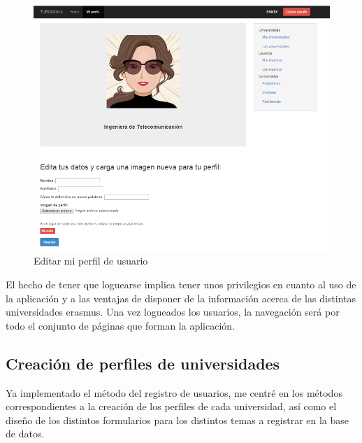 \begin{figure}[htbp]
	
	\centering
	\includegraphics[scale=0.5]{./Figuras/tuerasmusPages/privatePages/editProfile.png}
	\caption{Editar mi perfil de usuario}
	\label{fig:editProfUsu}
	
\end{figure}

El hecho de tener que loguearse implica tener unos privilegios en cuanto al uso de la aplicaci\'on y a las ventajas de disponer de la informaci\'on acerca de las distintas universidades erasmus. Una vez logueados los usuarios, la navegaci\'on ser\'a por todo el conjunto de p\'aginas que forman la aplicaci\'on.\\

\subsection{Creaci\'on de perfiles de universidades}
Ya implementado el m\'etodo del registro de usuarios, me centr\'e en los m\'etodos correspondientes a la creaci\'on de los perfiles de cada universidad, as\'i como el dise\~no de los distintos formularios para los distintos temas a registrar en la base de datos.\\

